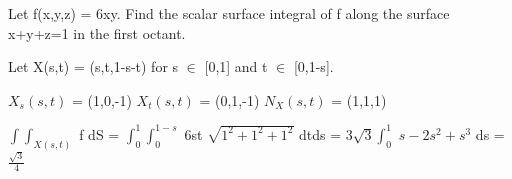     \vspace{0.5cm}



    \begin{example}
        Let f(x,y,z) = 6xy. Find the scalar surface integral of f along
        the surface x+y+z=1 in the first octant.
    \end{example}

    \begin{tbox}
        Let X(s,t) = (s,t,1-s-t) for s $\in$ [0,1] and t $\in$ [0,1-s].

        \hspace{0.5cm}
        $X_s(s,t)$ = (1,0,-1)
        \hspace{1cm}
        $X_t(s,t)$ = (0,1,-1)
        \hspace{1cm}
        $N_X(s,t)$ = (1,1,1)

        $\int \int_{X(s,t)}$ f dS
        = $\int_0^1 \int_0^{1-s}$ 6st $\sqrt{1^2 + 1^2 + 1^2}$ dtds
        = $3\sqrt{3} \int_0^1$ $s - 2s^2 + s^3$ ds
        = $\frac{\sqrt{3}}{4}$
    \end{tbox}

    \vspace{0.5cm}



